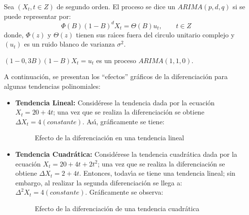 \begin{definicion}
Sea $(X_{t}, t\in Z)$ de segundo orden. El proceso se dice un $ARIMA (p, d, q)$ si se puede representar por:
\begin{equation}
\label{eq3}
\Phi ( B ){(1-B)}^{d}X_{t}=\Theta( B )u_{t},\qquad t\in Z
\end{equation}
donde, $\Phi(z)$ y $\Theta(z)$ tienen sus ra\'{\i}ces fuera del c\'{\i}rculo unitario complejo y $(u_{t})$ es un ruido blanco de varianza $\sigma^{2}$. 
\end{definicion}

\begin{ejemplo}
 $\left( 1-0,3B \right)\left( 1-B \right)X_{t}=u_{t}$ es un proceso $ARIMA(1,1,0)$.

A continuaci\'{o}n, se presentan los ``efectos'' gr\'{a}ficos de la 
diferenciaci\'{o}n para algunas 
tendencias polinomiales:


\begin{itemize}
\item \textbf{Tendencia Lineal:} Consid\'{e}rese la tendencia  dada por la ecuaci\'{o}n $X_{t}=20+4t$; una vez que se realiza la diferenciaci\'{o}n se obtiene ${\Delta }X_{t}=4 (constante)$. As\'{\i}, gr\'{a}ficamente se tiene:
\begin{figure}[H]
\centering
\caption{Efecto de la diferenciaci\'{o}n en una tendencia lineal}
\end{figure}

\item \textbf{Tendencia Cuadr\'{a}tica:} Consid\'{e}rese la tendencia cuadr\'{a}tica dada por la ecuaci\'{o}n $X_{t}=20+4t+2t^{2}$; una vez que se realiza la diferenciaci\'{o}n se obtiene ${\Delta }X_{t}=2+4t$. Entonces, todav\'{\i}a se tiene una tendencia lineal; sin embargo, al realizar la segunda diferenciaci\'{o}n se llega a: ${\Delta }^{2}X_{t}=4 (constante)$. Gr\'{a}ficamente se observa:

\begin{figure}[H]
\centering
\caption{Efecto de la diferenciaci\'{o}n de una tendencia cuadr\'{a}tica}
\end{figure}
\end{itemize}
\end{ejemplo}


